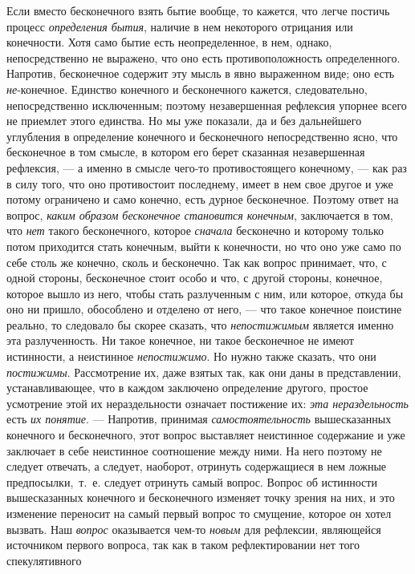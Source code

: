 Если вместо бесконечного взять бытие вообще, то кажется, что легче постичь
процесс {\em определения бытия}, наличие в нем
некоторого отрицания или конечности. Хотя само бытие есть неопределенное, в
нем, однако, непосредственно не выражено, что оно есть противоположность
определенного. Напротив, бесконечное содержит эту мысль в явно выраженном
виде; оно есть {\em не}{}-конечное. Единство конечного
и бесконечного кажется, следовательно, непосредственно исключенным; поэтому
незавершенная рефлексия упорнее всего не приемлет этого единства. Но мы уже
показали, да и без дальнейшего углубления в определение конечного и
бесконечного непосредственно ясно, что бесконечное в том смысле, в котором
его берет сказанная незавершенная рефлексия, — а именно в смысле чего-то
противостоящего конечному, — как раз в силу того, что оно противостоит
последнему, имеет в нем свое другое и уже потому ограничено и само конечно,
есть дурное бесконечное. Поэтому ответ на вопрос,
{\em каким образом бесконечное становится конечным},
заключается в том, что {\em нет} такого бесконечного,
которое {\em сначала} бесконечно и которому только
потом приходится стать конечным, выйти к конечности, но что оно уже само по
себе столь же конечно, сколь и бесконечно. Так как вопрос принимает, что, с
одной стороны, бесконечное стоит особо и что, с другой стороны, конечное,
которое вышло из него, чтобы стать разлученным с ним, или которое, откуда
бы оно ни пришло, обособлено и отделено от него, — что такое конечное
поистине реально, то следовало бы скорее сказать, что
{\em непостижимым} является именно эта разлученность.
Ни такое конечное, ни такое бесконечное не имеют истинности, а неистинное
{\em непостижимо}. Но нужно также сказать, что они
{\em постижимы}. Рассмотрение их, даже взятых так, как
они даны в представлении, устанавливающее, что в каждом заключено
определение другого, простое усмотрение этой их нераздельности означает
постижение их: {\em эта нераздельность} есть
{\em их понятие}. — Напротив, принимая
{\em самостоятельность} вышесказанных конечного и
бесконечного, этот вопрос выставляет неистинное содержание и уже заключает
в себе неистинное соотношение между ними. На него поэтому не следует
отвечать, а следует, наоборот, отринуть содержащиеся в нем ложные
предпосылки,~т.~е. следует отринуть самый вопрос. Вопрос об истинности
вышесказанных конечного и бесконечного изменяет точку зрения на них, и это
изменение переносит на самый первый вопрос то смущение, которое он хотел
вызвать. Наш {\em вопрос} оказывается чем-то
{\em новым} для рефлексии, являющейся источником
первого вопроса, так как в таком рефлектировании нет того спекулятивного
